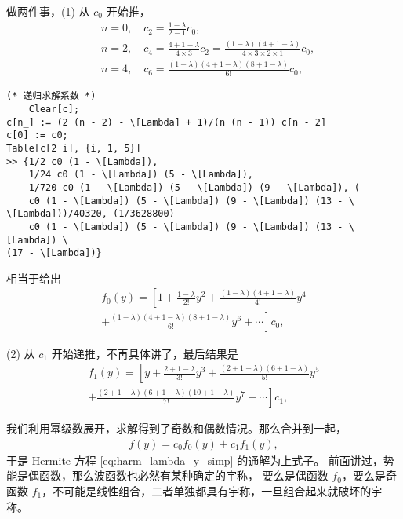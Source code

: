 做两件事，(1) 从 $c_0$ 开始推，
\begin{align}
    &n =0, \quad c_2 = \frac{1-\lambda}{2-1} c_0, \\
    &n=2, \quad c_4 = \frac{4 + 1 - \lambda}{4\times 3} c_2 = \frac{(1-\lambda)(4+1 - \lambda)}{4\times3\times2\times1} c_0, \\
    &n = 4, \quad c_6 = \frac{(1-\lambda) (4+1-\lambda) (8+1-\lambda)}{6!} c_0,
\end{align}
\begin{lstlisting}
(* 递归求解系数 *)
    Clear[c];
c[n_] := (2 (n - 2) - \[Lambda] + 1)/(n (n - 1)) c[n - 2]
c[0] := c0;
Table[c[2 i], {i, 1, 5}]
>> {1/2 c0 (1 - \[Lambda]), 
    1/24 c0 (1 - \[Lambda]) (5 - \[Lambda]), 
    1/720 c0 (1 - \[Lambda]) (5 - \[Lambda]) (9 - \[Lambda]), (
    c0 (1 - \[Lambda]) (5 - \[Lambda]) (9 - \[Lambda]) (13 - \
\[Lambda]))/40320, (1/3628800)
    c0 (1 - \[Lambda]) (5 - \[Lambda]) (9 - \[Lambda]) (13 - \[Lambda]) \
(17 - \[Lambda])}
\end{lstlisting}
相当于给出
\begin{multline}
    f_0(y) = 
    \left[
        1 + \frac{1-\lambda}{2!} y^2 + 
        \frac{(1-\lambda) (4+1 - \lambda)}{4!} y^4 \right. \\
        \left.+ \frac{(1-\lambda) (4+1-\lambda) (8+1-\lambda)}{6!} y^6 + \cdots
    \right] c_0,
\end{multline}

(2) 从 $c_1$ 开始递推，不再具体讲了，最后结果是
\begin{multline}
    f_1(y) = \left[y + \frac{2+1 - \lambda} {3!} y^3 + \frac{(2+1-\lambda)(6+1 -\lambda)}{5!} y^5 \right. \\
    \left.+ \frac{(2+1-\lambda)(6+1-\lambda)(10+1-\lambda)}{7!} y^7
    + \cdots \right] c_1,
\end{multline}

我们利用幂级数展开，求解得到了奇数和偶数情况。那么合并到一起，
\begin{align}
    f(y) = c_0 f_0(y) + c_1 f_1(y),
\end{align}
于是 Hermite 方程 \eqref{eq:harm_lambda_y_simp} 的通解为上式子。
前面讲过，势能是偶函数，那么波函数也必然有某种确定的宇称，
要么是偶函数 $f_0$，要么是奇函数 $f_1$，不可能是线性组合，二者单独都具有宇称，一旦组合起来就破坏的宇称。



